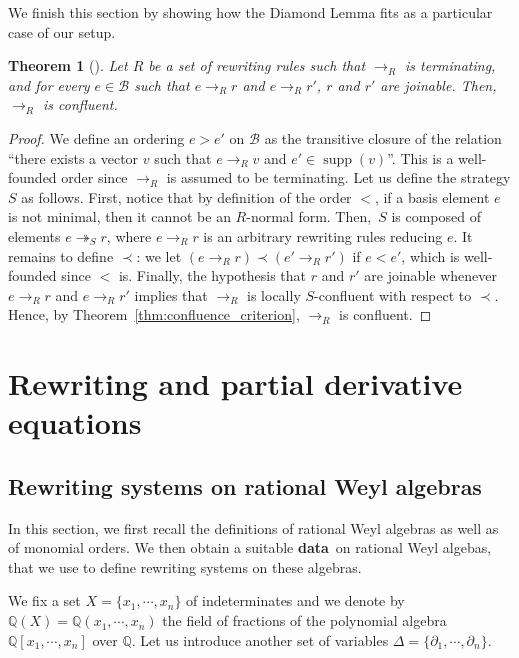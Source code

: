 \documentclass[10pt]{easychair}
\newtheorem{theorem}{Theorem}[section]
\theoremstyle{definition}
\newcommand\data{{\color{red}\bf data}}
\DeclareMathOperator{\supp}{supp}
\newcommand\diff[1]{\partial_{#1}}
\newcommand\basis{\mathscr{B}}
\newcommand\Q{\mathbb{Q}}
\newcommand\QX{\mathbb{Q}[x_1,\cdots,x_n]}
\newcommand\QXX{\mathbb{Q}(x_1,\cdots,x_n)}
\newcommand\rewR{\to_R}
\newcommand\rewS{\twoheadrightarrow_S}
\begin{document}
We finish this section by showing how the Diamond Lemma fits as a
particular case of our setup.
\medskip

\begin{theorem}[\cite{MR506890}]\label{thm:diamond_lemma}
  Let $R$ be a set of rewriting rules such that $\rewR$ is terminating,
  and for every $e\in\basis$ such that $e\rewR r$ and $e\rewR r'$, $r$
  and $r'$ are joinable. Then,~$\rewR$ is confluent.
\end{theorem}

\begin{proof}
  We define an ordering $e>e'$ on $\basis$ as the transitive closure of
  the relation ``there exists a vector $v$ such that $e\rewR v$ and
  $e'\in\supp(v)$''. This is a well-founded order since $\rewR$ is
  assumed to be terminating. Let us define the strategy $S$ as follows.
  First, notice that by definition of the order $<$, if a basis element
  $e$ is not minimal, then it cannot be an $R$-normal form. Then,~$S$ is
  composed of elements $e\rewS r$, where $e\rewR r$ is an arbitrary
  rewriting rules reducing $e$. It remains to define $\prec$: we let
  $(e\rewR r)\prec(e'\rewR r')$ if $e<e'$, which is well-founded since
  $<$ is. Finally, the hypothesis that $r$ and $r'$ are joinable whenever
  $e\rewR r$ and $e\rewR r'$ implies that $\rewR$ is locally
  $S$-confluent with respect to $\prec$. Hence, by
  Theorem~\ref{thm:confluence_criterion}, $\rewR$ is confluent.   
\end{proof}

\section{Rewriting and partial derivative equations}
\label{sec:rewriting_systems_and_partial_derivative_equations}

\subsection{Rewriting systems on rational Weyl algebras}
\label{sec:rewriting_systems_on_Weyl_algebras}

In this section, we first recall the definitions of rational Weyl
algebras as well as of monomial orders. We then obtain a suitable \data\
on rational Weyl algebas, that we use to define rewriting systems on 
these algebras.
\medskip


We fix a set $X=\{x_1,\cdots,x_n\}$ of indeterminates
and we denote by $\Q(X)=\QXX$ the field of fractions of the polynomial
algebra $\QX$ over $\Q$. Let us introduce another set of variables
$\Delta=\{\diff{1},\cdots,\diff{n}\}$.
\smallskip
\end{document}

